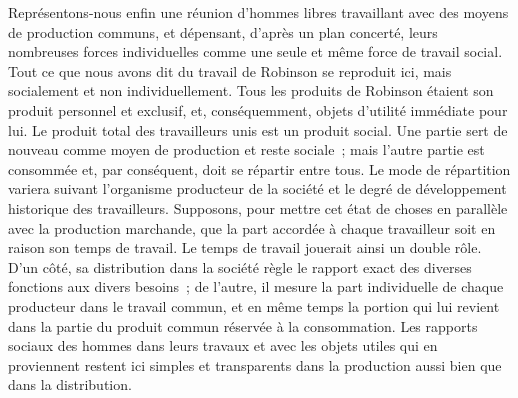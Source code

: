 \documentclass[french,twoside]{book} %
\begin{document}
Représentons-nous enfin une réunion d’hommes libres travaillant avec des moyens de production communs, et dépensant, d’après un plan concerté, leurs nombreuses forces individuelles comme une seule et même force de travail social. Tout ce que nous avons dit du travail de Robinson se reproduit ici, mais socialement et non individuellement. Tous les produits de Robinson étaient son produit personnel et exclusif, et, conséquemment, objets d’utilité immédiate pour lui. Le produit total des travailleurs unis est un produit social. Une partie sert de nouveau comme moyen de production et reste sociale ; mais l’autre partie est consommée et, par conséquent, doit se répartir entre tous. Le mode de répartition variera suivant l’organisme producteur de la société et le degré de développement historique des travailleurs. Supposons, pour mettre cet état de choses en parallèle avec la production marchande, que la part accordée à chaque travailleur soit en raison son temps de travail. Le temps de travail jouerait ainsi un double rôle. D’un côté, sa distribution dans la société règle le rapport exact des diverses fonctions aux divers besoins ; de l’autre, il mesure la part individuelle de chaque producteur dans le travail commun, et en même temps la portion qui lui revient dans la partie du produit commun réservée à la consommation. Les rapports sociaux des hommes dans leurs travaux et avec les objets utiles qui en proviennent restent ici simples et transparents dans la production aussi bien que dans la distribution.\par
\end{document}
